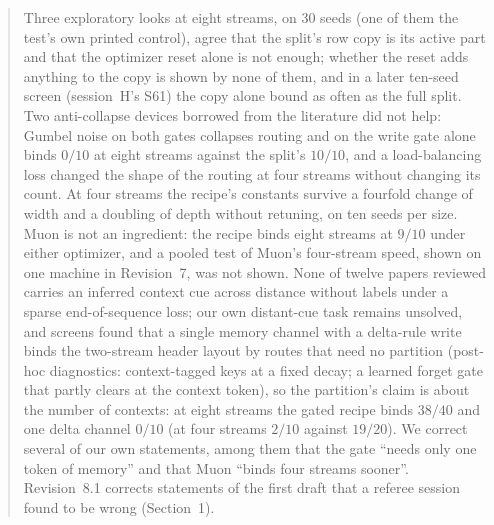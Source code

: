 \documentclass[11pt]{article}
\begin{document}
\begin{abstract}
Three exploratory looks at eight streams, on 30 seeds (one of them the test's own printed control), agree that the split's row copy is its active part and that the optimizer reset alone is not enough; whether the reset adds anything to the copy is shown by none of them, and in a later ten-seed screen (session~H's S61) the copy alone bound as often as the full split. Two anti-collapse devices borrowed from the literature did not help: Gumbel noise on both gates collapses routing and on the write gate alone binds $0/10$ at eight streams against the split's $10/10$, and a load-balancing loss changed the shape of the routing at four streams without changing its count. At four streams the recipe's constants survive a fourfold change of width and a doubling of depth without retuning, on ten seeds per size. Muon is not an ingredient: the recipe binds eight streams at $9/10$ under either optimizer, and a pooled test of Muon's four-stream speed, shown on one machine in Revision~7, was not shown. None of twelve papers reviewed carries an inferred context cue across distance without labels under a sparse end-of-sequence loss; our own distant-cue task remains unsolved, and screens found that a single memory channel with a delta-rule write binds the two-stream header layout by routes that need no partition (post-hoc diagnostics: context-tagged keys at a fixed decay; a learned forget gate that partly clears at the context token), so the partition's claim is about the number of contexts: at eight streams the gated recipe binds $38/40$ and one delta channel $0/10$ (at four streams $2/10$ against $19/20$). We correct several of our own statements, among them that the gate ``needs only one token of memory'' and that Muon ``binds four streams sooner''. Revision~8.1 corrects statements of the first draft that a referee session found to be wrong (Section~1).
\end{abstract}
\end{document}
